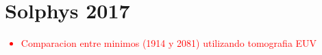 \chapter{Solphys 2017}
\textcolor{red}{
\begin{itemize}
  \item Comparacion entre minimos (1914 y 2081) utilizando tomografia EUV
\end{itemize}
}
